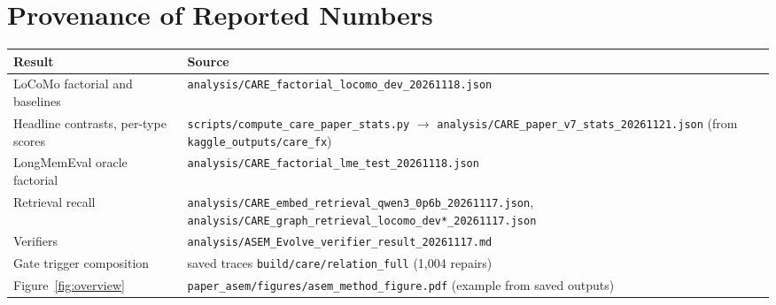 \documentclass[10pt]{article}
\theoremstyle{plain}
\begin{document}
\section{Provenance of Reported Numbers}
\label{app:provenance}

{\footnotesize
\begin{tabular}{>{\raggedright\arraybackslash}p{4.0cm}>{\raggedright\arraybackslash}p{11.5cm}}
\toprule
Result & Source \\
\midrule
LoCoMo factorial and baselines & \texttt{analysis/\allowbreak CARE\_factorial\_locomo\_dev\_20261118.json} \\
Headline contrasts, per-type scores & \texttt{scripts/\allowbreak compute\_care\_paper\_stats.py} $\to$ \texttt{analysis/\allowbreak CARE\_paper\_v7\_stats\_20261121.json} (from \texttt{kaggle\_outputs/\allowbreak care\_fx}) \\
LongMemEval oracle factorial & \texttt{analysis/\allowbreak CARE\_factorial\_lme\_test\_20261118.json} \\
Retrieval recall & \texttt{analysis/\allowbreak CARE\_embed\_retrieval\_qwen3\_0p6b\_20261117.json}, \texttt{analysis/\allowbreak CARE\_graph\_retrieval\_locomo\_dev*\_20261117.json} \\
Verifiers & \texttt{analysis/\allowbreak ASEM\_Evolve\_verifier\_result\_20261117.md} \\
Gate trigger composition & saved traces \texttt{build/care/relation\_full} (1,004 repairs) \\
Figure~\ref{fig:overview} & \texttt{paper\_asem/figures/\allowbreak asem\_method\_figure.pdf} (example from saved outputs) \\
\bottomrule
\end{tabular}}
\end{document}
